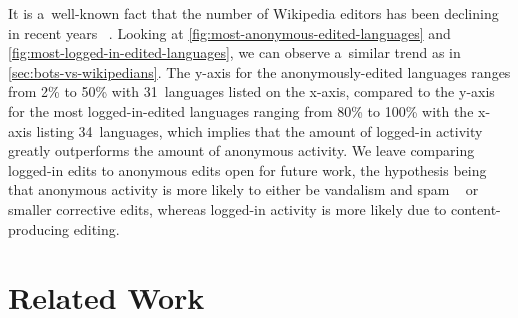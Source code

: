 \documentclass{sig-alternate}
\begin{document}
It is a~well-known fact that the number of Wikipedia editors
has been declining in recent years%
~\cite{halfaker2013wikipedia}.
Looking at \autoref{fig:most-anonymous-edited-languages} and
\autoref{fig:most-logged-in-edited-languages},
we can observe a~similar trend as in \autoref{sec:bots-vs-wikipedians}.
The y-axis for the anonymously-edited languages
ranges from 2\% to 50\% with 31~languages listed on the x-axis,
compared to the y-axis for the most logged-in-edited languages
ranging from 80\% to 100\% with the x-axis listing 34~languages,
which implies that the amount of logged-in activity
greatly outperforms the amount of anonymous activity.
We leave comparing logged-in edits to anonymous edits 
open for future work, the hypothesis being that anonymous activity
is more likely to either be vandalism and spam%
~\cite{alfonseca2013spam} or smaller corrective edits,
whereas logged-in activity is more likely
due to content-producing editing.

\section{Related Work}
\end{document}
